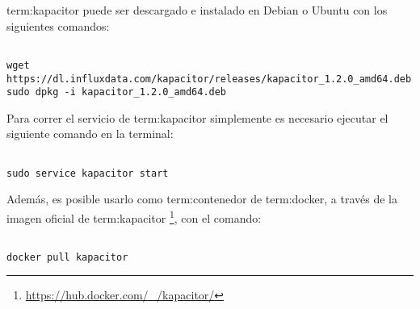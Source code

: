 \gls{term:kapacitor} puede ser descargado e instalado en Debian o Ubuntu con
los siguientes comandos:

\begin{lstlisting}

wget https://dl.influxdata.com/kapacitor/releases/kapacitor_1.2.0_amd64.deb
sudo dpkg -i kapacitor_1.2.0_amd64.deb

\end{lstlisting}

Para correr el servicio de \gls{term:kapacitor} simplemente es necesario
ejecutar el siguiente comando en la terminal:

\begin{lstlisting}

sudo service kapacitor start

\end{lstlisting}

Además, es posible usarlo como \gls{term:contenedor} de \gls{term:docker},
a través de la imagen oficial de \gls{term:kapacitor}
\footnote{\url{https://hub.docker.com/_/kapacitor/}}, con el comando:

\begin{lstlisting}

docker pull kapacitor

\end{lstlisting}
